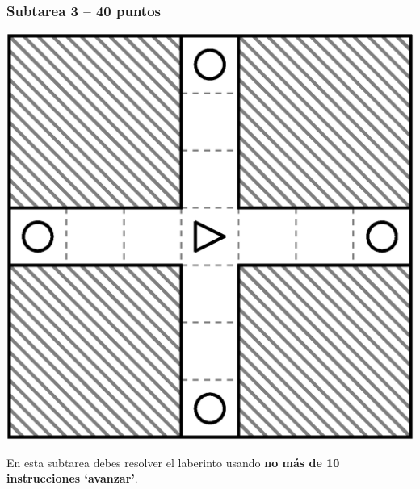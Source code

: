 \documentclass{oci}
\begin{document}
\subsubsection*{Subtarea 3 -- 40 puntos}
\begin{minipage}{0.5\linewidth}
  \centering
\includegraphics[scale=0.5]{laberintos/Subtarea3.eps}
\end{minipage}
\begin{minipage}{0.45\linewidth}
En esta subtarea debes resolver el laberinto usando \textbf{no más de 10 instrucciones `avanzar'}.
\end{minipage}


\end{document}
